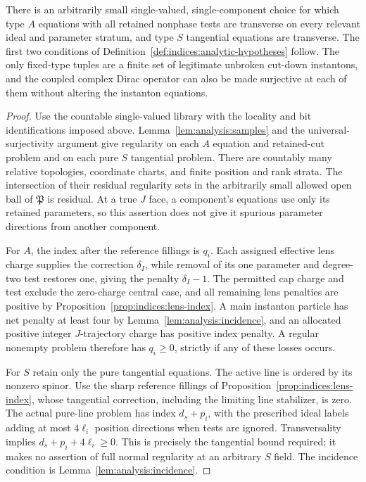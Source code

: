 \begin{proposition}
\label{prop:analysis:first-stage}
There is an arbitrarily small single-valued, single-component choice
for which type $A$ equations with all retained nonphase tests are
transverse on every relevant ideal and parameter stratum, and type
$S$ tangential equations are transverse.  The first two conditions of
Definition~\ref{def:indices:analytic-hypotheses} follow.  The only
fixed-type tuples are a finite set of legitimate unbroken cut-down
instantons, and the coupled complex Dirac operator can also be made
surjective at each of them without altering the instanton equations.
\end{proposition}
\begin{proof}
Use the countable single-valued library with the locality and bit
identifications imposed above.  Lemma~\ref{lem:analysis:samples} and
the universal-surjectivity argument give regularity on each $A$
equation and retained-cut problem and on each pure $S$ tangential
problem.  There are countably many relative topologies, coordinate
charts, and finite position and rank strata.  The intersection of
their residual regularity sets in the arbitrarily small allowed open
ball of $\mathfrak P$ is residual.  At a true $J$ face, a component's
equations use only its retained parameters, so this assertion does not
give it spurious parameter directions from another component.

For $A$, the index after the reference fillings is $q_i$.  Each assigned
effective lens charge supplies the correction $\delta_I$, while removal
of its one parameter
and degree-two test restores one, giving the penalty $\delta_I-1$.
The permitted cap charge and test exclude the zero-charge central
case, and all remaining lens penalties are positive by
Proposition~\ref{prop:indices:lens-index}.  A main instanton particle
has net penalty at least four by Lemma~\ref{lem:analysis:incidence},
and an allocated positive integer $J$-trajectory charge has positive
index penalty.  A regular nonempty problem therefore has $q_i\geq0$,
strictly if any of these losses occurs.

For $S$ retain only the pure tangential equations.  The active line is
ordered by its nonzero spinor.  Use the sharp reference fillings of
Proposition~\ref{prop:indices:lens-index}, whose tangential correction,
including the limiting line stabilizer, is zero.  The actual pure-line
problem has index $d_s+p_i$, with the prescribed ideal labels adding
at most $4\ell_i$ position directions when tests are ignored.
Transversality implies $d_s+p_i+4\ell_i\geq0$.  This is precisely the
tangential bound required; it makes no assertion of full normal
regularity at an arbitrary $S$ field.  The incidence condition is
Lemma~\ref{lem:analysis:incidence}.


\end{proof}
